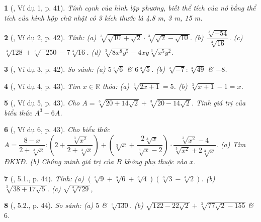 \documentclass{article}
\newtheorem{baitoan}{}%
\begin{document}
\begin{baitoan}[\cite{Binh_boi_duong_Toan_9_tap_1}, Ví dụ 1, p. 41]
	Tính cạnh của hình lập phương, biết thể tích của nó bằng thể tích của hình hộp chữ nhật có 3 kích thước là {\rm4.8 m, 3 m, 15 m}.
\end{baitoan}

\begin{baitoan}[\cite{Binh_boi_duong_Toan_9_tap_1}, Ví dụ 2, p. 42]
	Tính: (a) $\sqrt[3]{\sqrt{10} + \sqrt{2}}\cdot\sqrt[3]{\sqrt{2} - \sqrt{10}}$. (b) $\dfrac{\sqrt[3]{-54}}{\sqrt[3]{16}}$. (c) $\sqrt[3]{128} + \sqrt[3]{-250} - 7\sqrt[3]{16}$. (d) $\sqrt[3]{8x^8y^5} - 4xy\sqrt[3]{x^5y^2}$.
\end{baitoan}

\begin{baitoan}[\cite{Binh_boi_duong_Toan_9_tap_1}, Ví dụ 3, p. 42]
	So sánh: (a) $5\sqrt[3]{6}$ \& $6\sqrt[3]{5}$. (b) $\sqrt[3]{-7}:\sqrt[3]{49}$ \& $-8$.
\end{baitoan}

\begin{baitoan}[\cite{Binh_boi_duong_Toan_9_tap_1}, Ví dụ 4, p. 43]
	Tìm $x\in\mathbb{R}$ thỏa: (a) $\sqrt[3]{2x + 1} = 5$. (b) $\sqrt[3]{x + 1} - 1 = x$.
\end{baitoan}

\begin{baitoan}[\cite{Binh_boi_duong_Toan_9_tap_1}, Ví dụ 5, p. 43]
	Cho $A = \sqrt[3]{20 + 14\sqrt{2}} + \sqrt[3]{20 - 14\sqrt{2}}$. Tính giá trị của biểu thức $A^3 - 6A$.
\end{baitoan}

\begin{baitoan}[\cite{Binh_boi_duong_Toan_9_tap_1}, Ví dụ 6, p. 43]
	Cho biểu thức $A = \dfrac{8 - x}{2 + \sqrt[3]{x}}:\left(2 + \dfrac{\sqrt[3]{x^2}}{2 + \sqrt[3]{x}}\right) + \left(\sqrt[3]{x} + \dfrac{2\sqrt[3]{x}}{\sqrt[3]{x} - 2}\right)\cdot\dfrac{\sqrt[3]{x^2} - 4}{\sqrt[3]{x^2} + 2\sqrt[3]{x}}$. (a) Tìm {\rm ĐKXĐ}. (b) Chứng minh giá trị của $B$ không phụ thuộc vào $x$.
\end{baitoan}

\begin{baitoan}[\cite{Binh_boi_duong_Toan_9_tap_1}, 5.1., p. 44]
	Tính: (a) $(\sqrt[3]{9} + \sqrt[3]{6} + \sqrt[3]{4})(\sqrt[3]{3} - \sqrt[3]{2})$. (b) $\sqrt[3]{38 + 17\sqrt{5}}$. (c) $\sqrt{\sqrt[3]{729}}$,
\end{baitoan}

\begin{baitoan}[\cite{Binh_boi_duong_Toan_9_tap_1}, 5.2., p. 44]
	So sánh: (a) $5$ \& $\sqrt[3]{130}$. (b) $\sqrt{122 - 22\sqrt{2}} + \sqrt[3]{77\sqrt{2} - 155}$ \& $6$.
\end{baitoan}
\end{document}
